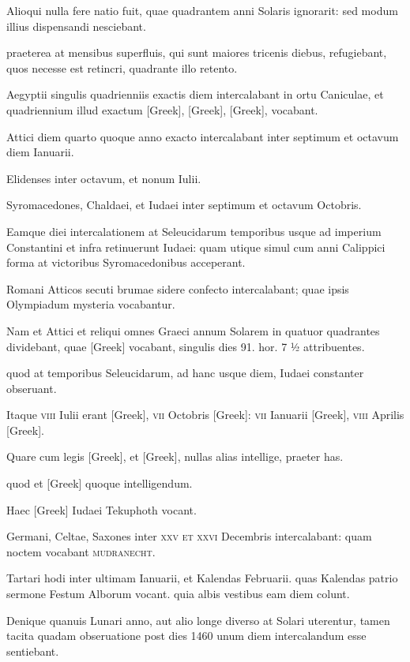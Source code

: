 Alioqui nulla fere natio fuit, quae
quadrantem anni Solaris ignorarit: sed modum illius dispensandi
nesciebant.

praeterea at mensibus superfluis, qui sunt maiores tricenis
diebus, refugiebant, quos necesse est retincri,
 quadrante illo retento.

Aegyptii singulis quadrienniis exactis diem intercalabant in ortu Caniculae,
et quadriennium illud exactum \textgreek{[Greek]}, \textgreek{[Greek]},
\textgreek{[Greek]}, vocabant.

Attici diem quarto quoque anno exacto intercalabant
inter septimum et octavum diem Ianuarii.

Elidenses inter
octavum, et nonum Iulii.

Syromacedones, Chaldaei, et Iudaei inter
septimum et octavum Octobris.

Eamque diei intercalationem at Seleucidarum
temporibus usque ad imperium Constantini et infra retinuerunt
Iudaei: quam utique simul cum anni Calippici forma at victoribus
Syromacedonibus acceperant.

Romani Atticos secuti brumae
sidere confecto intercalabant; quae ipsis Olympiadum mysteria vocabantur.

Nam et Attici et reliqui omnes Graeci annum Solarem in
quatuor quadrantes dividebant, quae \textgreek{[Greek]}
 vocabant, singulis dies 91.
hor. 7 ½ attribuentes.

quod at temporibus Seleucidarum, ad hanc usque
diem, Iudaei constanter obseruant.

Itaque \textsc{viii} Iulii erant \textgreek{[Greek]},
\textsc{vii} Octobris \textgreek{[Greek]}:
 \textsc{vii} Ianuarii \textgreek{[Greek]}, \textsc{viii}
Aprilis \textgreek{[Greek]}.

Quare cum legis \textgreek{[Greek]}, et \textgreek{[Greek]},
nullas alias intellige, praeter has.

quod et \textgreek{[Greek]} quoque intelligendum.

Haec \textgreek{[Greek]} Iudaei Tekuphoth vocant.

Germani, Celtae,
Saxones inter \textsc{xxv et xxvi} Decembris intercalabant: quam noctem
vocabant \textsc{mudranecht}.

Tartari hodi inter ultimam Ianuarii,
et Kalendas Februarii. quas Kalendas patrio sermone Festum Alborum
vocant. quia albis vestibus eam diem colunt.

Denique quanuis
Lunari anno, aut alio longe diverso at Solari uterentur, tamen tacita
quadam obseruatione post dies 1460 unum diem intercalandum esse
sentiebant.

